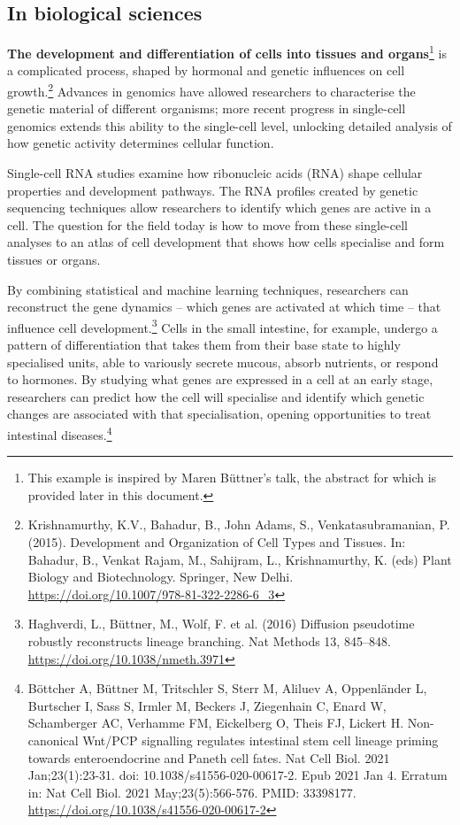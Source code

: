 \subsection{\texorpdfstring{In biological sciences
}{In biological sciences }}\label{in-biological-sciences}

\textbf{The development and differentiation of cells into tissues and
organs}\footnote{This example is inspired by Maren Büttner's talk, the
  abstract for which is provided later in this document.} is a
complicated process, shaped by hormonal and genetic influences on cell
growth.\footnote{Krishnamurthy, K.V., Bahadur, B., John Adams, S.,
  Venkatasubramanian, P. (2015). Development and Organization of Cell
  Types and Tissues. In: Bahadur, B., Venkat Rajam, M., Sahijram, L.,
  Krishnamurthy, K. (eds) Plant Biology and Biotechnology. Springer, New
  Delhi.
  \href{https://doi.org/10.1007/978-81-322-2286-6_3}{\uline{https://doi.org/10.1007/978-81-322-2286-6\_3}}}
Advances in genomics have allowed researchers to characterise the
genetic material of different organisms; more recent progress in
single-cell genomics extends this ability to the single-cell level,
unlocking detailed analysis of how genetic activity determines cellular
function.

Single-cell RNA studies examine how ribonucleic acids (RNA) shape
cellular properties and development pathways. The RNA profiles created
by genetic sequencing techniques allow researchers to identify which
genes are active in a cell. The question for the field today is how to
move from these single-cell analyses to an atlas of cell development
that shows how cells specialise and form tissues or organs.

By combining statistical and machine learning techniques, researchers
can reconstruct the gene dynamics -- which genes are activated at which
time -- that influence cell development.\footnote{Haghverdi, L.,
  Büttner, M., Wolf, F. et al. (2016) Diffusion pseudotime robustly
  reconstructs lineage branching. Nat Methods 13, 845--848.
  \href{https://doi.org/10.1038/nmeth.3971}{\uline{https://doi.org/10.1038/nmeth.3971}}}
Cells in the small intestine, for example, undergo a pattern of
differentiation that takes them from their base state to highly
specialised units, able to variously secrete mucous, absorb nutrients,
or respond to hormones. By studying what genes are expressed in a cell
at an early stage, researchers can predict how the cell will specialise
and identify which genetic changes are associated with that
specialisation, opening opportunities to treat intestinal
diseases.\footnote{Böttcher A, Büttner M, Tritschler S, Sterr M, Aliluev
  A, Oppenländer L, Burtscher I, Sass S, Irmler M, Beckers J, Ziegenhain
  C, Enard W, Schamberger AC, Verhamme FM, Eickelberg O, Theis FJ,
  Lickert H. Non-canonical Wnt/PCP signalling regulates intestinal stem
  cell lineage priming towards enteroendocrine and Paneth cell fates.
  Nat Cell Biol. 2021 Jan;23(1):23-31. doi: 10.1038/s41556-020-00617-2.
  Epub 2021 Jan 4. Erratum in: Nat Cell Biol. 2021 May;23(5):566-576.
  PMID: 33398177. \url{https://doi.org/10.1038/s41556-020-00617-2}}


